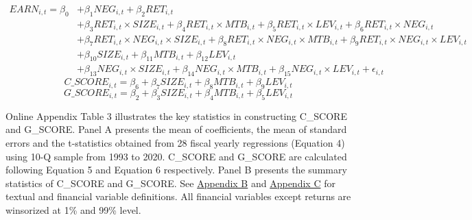 \newpage

\setcounter{equation}{3}
\begin{equation}
\begin{split}
EARN_{i,t} = \beta_0&+\beta_1NEG_{i,t}+\beta_2RET_{i,t}\\
&+\beta_3RET_{i,t}\times SIZE_{i,t}+\beta_4RET_{i,t}\times MTB_{i,t}+\beta_5RET_{i,t}\times LEV_{i,t}+\beta_6RET_{i,t}\times NEG_{i,t}\\
&+\beta_7RET_{i,t}\times NEG_{i,t}\times SIZE_{i,t}+\beta_8RET_{i,t}\times NEG_{i,t}\times MTB_{i,t}+\beta_9RET_{i,t}\times NEG_{i,t}\times LEV_{i,t}\\
&+\beta_{10}SIZE_{i,t}+\beta_{11}MTB_{i,t}+\beta_{12}LEV_{i,t}\\
&+\beta_{13}NEG_{i,t}\times SIZE_{i,t}+\beta_{14}NEG_{i,t}\times MTB_{i,t}+\beta_{15}NEG_{i,t}\times LEV_{i,t}+ \epsilon_{i,t}
\end{split}
\end{equation}
\begin{equation}
C\_SCORE_{i,t} = \beta_6+\beta_7SIZE_{i,t}+\beta_8MTB_{i,t}+\beta_9LEV_{i,t}
\end{equation}
\begin{equation}
G\_SCORE_{i,t} = \beta_2+\beta_3SIZE_{i,t}+\beta_4MTB_{i,t}+\beta_5LEV_{i,t}
\end{equation}

Online Appendix Table 3 illustrates the key statistics in constructing C\_SCORE and G\_SCORE. Panel A presents the mean of coefficients, the mean of standard errors and the t-statistics obtained from 28 fiscal yearly regressions (Equation 4) using 10-Q sample from 1993 to 2020. C\_SCORE and G\_SCORE are calculated following Equation 5 and Equation 6 respectively. Panel B presents the summary statistics of C\_SCORE and G\_SCORE. See \hyperref[appb]{Appendix B} and \hyperref[appc]{Appendix C} for textual and financial variable definitions. All financial variables except returns are winsorized at 1\% and 99\% level.

